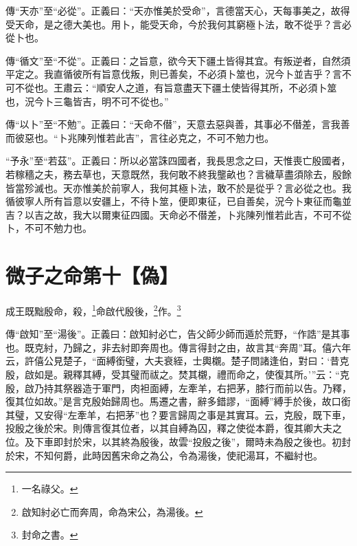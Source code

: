 {\noindent\zhuan{}\fzbyks 傳“天亦”至“必從”。正義曰：“天亦惟美於受命”，言德當天心，天每事美之，故得受天命，是之德大美也。用卜，能受天命，今於我何其窮極卜法，敢不從乎？言必從卜也。 \par}

{\noindent\zhuan{}\fzbyks 傳“循文”至“不從”。正義曰：之旨意，欲今天下疆土皆得其宜。有叛逆者，自然須平定之。我直循彼所有旨意伐叛，則已善矣，不必須卜筮也，況今卜並吉乎？言不可不從也。王肅云：“順安人之道，有旨意盡天下疆土使皆得其所，不必須卜筮也，況今卜三龜皆吉，明不可不從也。” \par}

{\noindent\zhuan{}\fzbyks 傳“以卜”至“不勉”。正義曰：“天命不僣”，天意去惡與善，其事必不僣差，言我善而彼惡也。“卜兆陳列惟若此吉”，言往必克之，不可不勉力也。 \par}

{\noindent\shu{}\fzkt “予永”至“若茲”。正義曰：所以必當誅四國者，我長思念之曰，天惟喪亡殷國者，若稼穡之夫，務去草也，天意既然，我何敢不終我壟畝也？言穢草盡須除去，殷餘皆當殄滅也。天亦惟美於前寧人，我何其極卜法，敢不於是從乎？言必從之也。我循彼寧人所有旨意以安疆上，不待卜筮，便即東征，已自善矣，況今卜東征而龜並吉？以吉之故，我大以爾東征四國。天命必不僣差，卜兆陳列惟若此吉，不可不從卜，不可不勉力也。 \par}

\section{微子之命第十【偽】}


成王既黜殷命，殺，\footnote{一名祿父。}命啟代殷後，\footnote{啟知紂必亡而奔周，命為宋公，為湯後。}作。\footnote{封命之書。}


{\noindent\zhuan{}\fzbyks 傳“啟知”至“湯後”。正義曰：啟知紂必亡，告父師少師而遁於荒野，“作誥”是其事也。既克紂，乃歸之，非去紂即奔周也。傳言得封之由，故言其“奔周”耳。僖六年云，許僖公見楚子，“面縛銜璧，大夫衰絰，士輿櫬。楚子問諸逢伯，對曰：‘昔克殷，啟如是。親釋其縛，受其璧而祓之。焚其櫬，禮而命之，使復其所。’”云：“克殷，啟乃持其祭器造于軍門，肉袒面縛，左牽羊，右把茅，膝行而前以告。乃釋，復其位如故。”是言克殷始歸周也。馬遷之書，辭多錯謬，“面縛”縛手於後，故口銜其璧，又安得“左牽羊，右把茅”也？要言歸周之事是其實耳。云，克殷，既下車，投殷之後於宋。則傳言復其位者，以其自縛為囚，釋之使從本爵，復其卿大夫之位。及下車即封於宋，以其終為殷後，故雲“投殷之後”，爾時未為殷之後也。初封於宋，不知何爵，此時因舊宋命之為公，令為湯後，使祀湯耳，不繼紂也。 \par}

